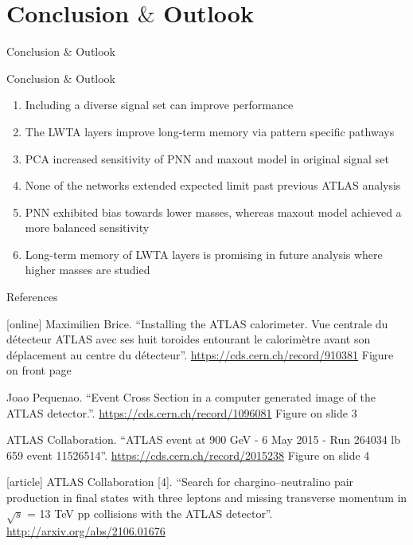 \documentclass[UKenglish]{beamer}
\begin{document}
\section{Conclusion $\&$ Outlook}
\begin{frame}{Conclusion $\&$ Outlook}
    \tableofcontents[currentsection]
\end{frame}
\begin{frame}{Conclusion $\&$ Outlook}
    \begin{enumerate}
        \item Including a diverse signal set can improve performance
        \item The LWTA layers improve long-term memory via pattern specific pathways
        \item PCA increased sensitivity of PNN and maxout model in original signal set
        \item None of the networks extended expected limit past previous ATLAS analysis
        \item PNN exhibited bias towards lower masses, whereas maxout model achieved a more balanced 
              sensitivity
        \item Long-term memory of LWTA layers is promising in future analysis where higher masses are studied 
    \end{enumerate}
\end{frame}





\begin{frame}{References}
    \begin{thebibliography}{}
        \scriptsize
        [online]
        Maximilien Brice.
        \newblock \enquote{Installing the ATLAS calorimeter. Vue centrale du
        détecteur ATLAS avec ses huit toroides entourant le
        calorimètre avant son déplacement au centre du
        détecteur}.
        \newblock \url{https://cds.cern.ch/record/910381}
        \newblock Figure on front page

        Joao Pequenao.
        \newblock \enquote{Event Cross Section in a computer generated image of the ATLAS detector.}.
        \newblock \url{https://cds.cern.ch/record/1096081}
        \newblock Figure on slide 3

        ATLAS Collaboration.
        \newblock \enquote{ATLAS event at 900 GeV - 6 May 2015 - Run 264034 lb 659
        event 11526514}.
        \newblock \url{https://cds.cern.ch/record/2015238}
        \newblock Figure on slide 4

        [article]
        ATLAS Collaboration [4].
        \newblock \enquote{Search for chargino--neutralino pair production in final states with three leptons and missing transverse momentum in {$\sqrt{s}$} = 13 {TeV} pp collisions with the {ATLAS} detector}.
        \newblock \url{http://arxiv.org/abs/2106.01676}

    \end{thebibliography}
\end{frame}
\end{document}
